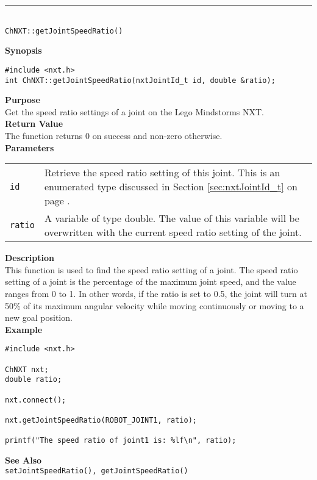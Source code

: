 \noindent
\vspace{5pt}
\rule{4.5in}{0.015in}\\
\noindent
{\LARGE \texttt{ChNXT::getJointSpeedRatio()}}\\
{}

\noindent
{\bf Synopsis}
\vspace{-8pt}
\begin{verbatim}
#include <nxt.h>
int ChNXT::getJointSpeedRatio(nxtJointId_t id, double &ratio);
\end{verbatim}

\noindent
{\bf Purpose}\\
Get the speed ratio settings of a joint on the Lego Mindstorms NXT.\\

\noindent
{\bf Return Value}\\
The function returns 0 on success and non-zero otherwise.\\

\noindent
{\bf Parameters}
\vspace{-0.1in}
\begin{description}
\item               
\begin{tabular}{p{10 mm}p{145 mm}}
\texttt{id} & Retrieve the speed ratio setting of this joint. This is an 
enumerated type discussed in Section \ref{sec:nxtJointId_t} on page
\pageref{sec:nxtJointId_t}.\\
\texttt{ratio} & A variable of type double. The value of this variable will
be overwritten with the current speed ratio setting of the joint.
\end{tabular}
\end{description}

\noindent
{\bf Description}\\
This function is used to find the speed ratio setting of a joint. The speed
ratio setting of a joint is the percentage of the maximum joint speed, and the
value ranges from 0 to 1. In other words, if the ratio is set to 0.5, the joint 
will turn at 50\% of its maximum angular velocity while moving continuously
or moving to a new goal position.\\

\noindent
{\bf Example}\\
\begin{verbatim}
#include <nxt.h>

ChNXT nxt;
double ratio;

nxt.connect();

nxt.getJointSpeedRatio(ROBOT_JOINT1, ratio);

printf("The speed ratio of joint1 is: %lf\n", ratio);
\end{verbatim}

\noindent
{\bf See Also}\\
\texttt{setJointSpeedRatio(), getJointSpeedRatio()}

